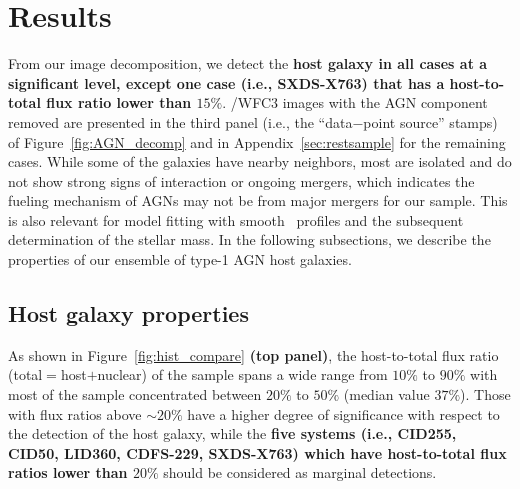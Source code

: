 \documentclass[apj]{emulateapj}
\begin{document}
\section{Results}
\label{sec:result}

From our image decomposition, we detect the {\bf host galaxy in all cases at a significant level, except one case (i.e., SXDS-X763) that has a host-to-total flux ratio lower than $15\%$}. \hst/WFC3 images with the AGN component removed are presented in the third panel (i.e., the ``data$-$point source'' stamps) of Figure~\ref{fig:AGN_decomp} and in Appendix~\ref{sec:restsample} for the remaining cases. While some of the galaxies have nearby neighbors, most are isolated and do not show strong signs of interaction or ongoing mergers, which indicates the fueling mechanism of AGNs may not be from major mergers for our sample. This is also relevant for model fitting with smooth \sersic\ profiles and the subsequent determination of the stellar mass. In the following subsections, we describe the properties of our ensemble of type-1 AGN host galaxies.
 
\subsection{Host galaxy properties}
\label{sec:result-hosts}
As shown in Figure~\ref{fig:hist_compare} {\bf (top panel)}, the host-to-total flux ratio (total$=$host$+$nuclear) of the sample spans a wide range from $10\%$ to $90\%$ with most of the sample concentrated between $20\%$ to $50\%$ (median value $37\%$). Those with flux ratios above $\sim20\%$ have a higher degree of significance with respect to the detection of the host galaxy, while the {\bf five systems (i.e., CID255, CID50, LID360, CDFS-229, SXDS-X763) which have host-to-total flux ratios lower than $20\%$} should be considered as marginal detections. 
\end{document}
